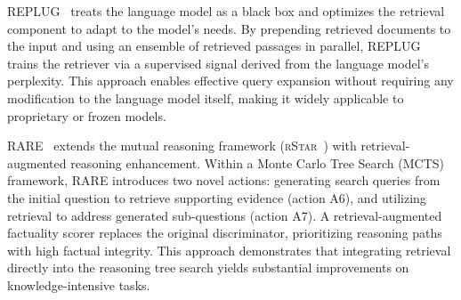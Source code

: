 \documentclass{article}
\begin{document}
\textsc{REPLUG}~\citep{REPLUG} treats the language model as a black box and optimizes the retrieval component to adapt to the model's needs. By prepending retrieved documents to the input and using an ensemble of retrieved passages in parallel, REPLUG trains the retriever via a supervised signal derived from the language model's perplexity. This approach enables effective query expansion without requiring any modification to the language model itself, making it widely applicable to proprietary or frozen models.

\textsc{RARE}~\citep{RARE} extends the mutual reasoning framework (\textsc{rStar}~\citep{rStar}) with retrieval-augmented reasoning enhancement. Within a Monte Carlo Tree Search (MCTS) framework, RARE introduces two novel actions: generating search queries from the initial question to retrieve supporting evidence (action A6), and utilizing retrieval to address generated sub-questions (action A7). A retrieval-augmented factuality scorer replaces the original discriminator, prioritizing reasoning paths with high factual integrity. This approach demonstrates that integrating retrieval directly into the reasoning tree search yields substantial improvements on knowledge-intensive tasks.
\end{document}
